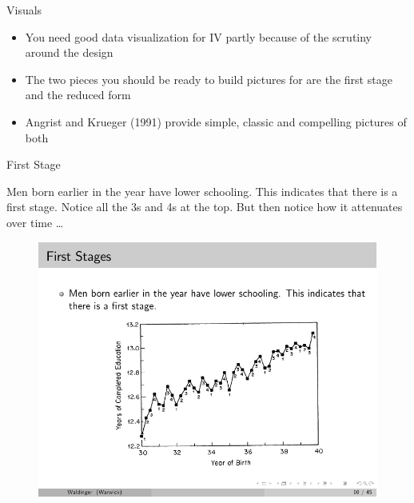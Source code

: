 \documentclass{beamer}
\begin{document}
\begin{frame}{Visuals}

\begin{itemize}
\item You need good data visualization for IV partly because of the scrutiny around the design
\item The two pieces you should be ready to build pictures for are the first stage and the reduced form
\item Angrist and Krueger (1991) provide simple, classic and compelling pictures of both
\end{itemize}

\end{frame}



\begin{frame}{First Stage}
	
	 Men born earlier in the year have lower schooling. This indicates that there is a first stage. Notice all the 3s and 4s at the top. But then notice how it attenuates over time \dots
	
	\begin{figure}
	\includegraphics{./lecture_includes/qob_2.pdf}
	\end{figure}
	
\end{frame}
\end{document}
